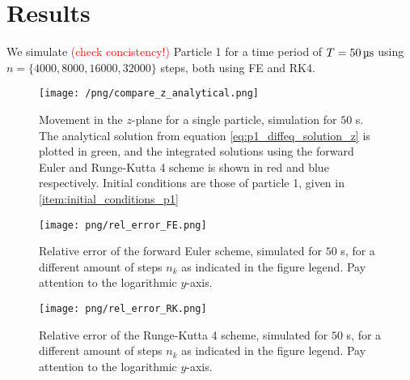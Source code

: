 \section{Results}\label{sec:results}



We simulate \textcolor{red}{(check concistency!)} Particle 1 for a time period of $T = 50 \,\mathrm{\text{\textmu} s}$ using $n=\{4000, 8000, 16000, 32000 \}$ steps, both using FE and RK4. %


\begin{figure}
    \texttt{[image: /png/compare\_z\_analytical.png]}
    \caption{Movement in the $z$-plane for a single particle, simulation for $50$ \textmu s. The analytical solution from equation \ref{eq:p1_diffeq_solution_z} is plotted in green, and the integrated solutions using the forward Euler and Runge-Kutta 4 scheme is shown in red and blue respectively. Initial conditions are those of particle 1, given in \ref{item:initial_conditions_p1} }
    \label{fig:compare_z_analytical}
\end{figure}


\begin{figure}
    \texttt{[image: png/rel\_error\_FE.png]}
    \caption{Relative error of the forward Euler scheme, simulated for $50$ \textmu s, for a different amount of steps $n_k$ as indicated in the figure legend. Pay attention to the logarithmic $y$-axis.}
    \label{fig:error_FE}
\end{figure}


\begin{figure}
    \texttt{[image: png/rel\_error\_RK.png]}
    \caption{Relative error of the Runge-Kutta 4 scheme, simulated for $50$ \textmu s, for a different amount of steps $n_k$ as indicated in the figure legend. Pay attention to the logarithmic $y$-axis.}
    \label{fig:error_RK}
\end{figure}

